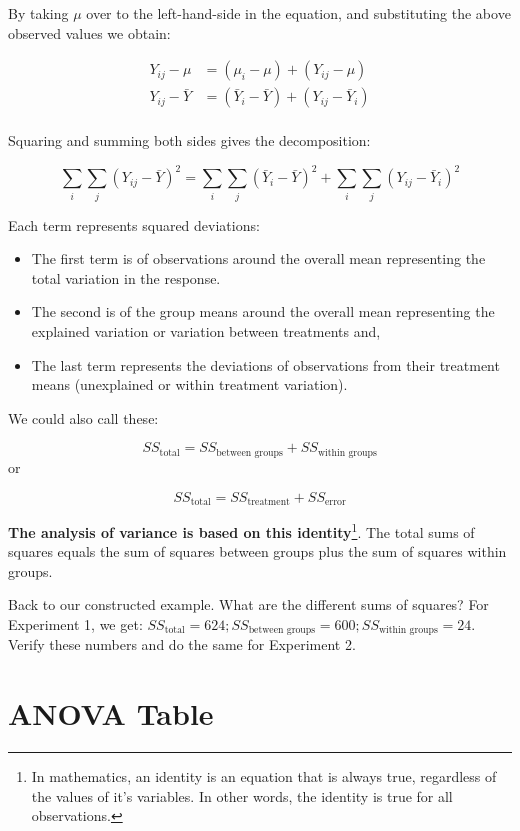 \documentclass[
  letterpaper,
]{book}
\providecommand{\tightlist}{%
  \setlength{\itemsep}{0pt}\setlength{\parskip}{0pt}}\usepackage{longtable,booktabs,array}
\begin{document}
By taking \(\mu\) over to the left-hand-side in the equation, and
substituting the above observed values we obtain:

\[
\begin{aligned}
Y_{ij} - \mu &= (\mu_i - \mu) + (Y_{ij} - \mu)\\
Y_{ij} - \bar{Y} &= (\bar{Y}_i - \bar{Y}) + (Y_{ij} - \bar{Y}_i) \\
\end{aligned}
\]

Squaring and summing both sides gives the decomposition:

\[
\sum_i \sum_j (Y_{ij} - \bar{Y})^2 = \sum_i \sum_j (\bar{Y}_i - \bar{Y})^2 + \sum_i \sum_j (Y_{ij} - \bar{Y}_i)^2
\]

Each term represents squared deviations:

\begin{itemize}
\tightlist
\item
  The first term is of observations around the overall mean representing
  the total variation in the response.
\item
  The second is of the group means around the overall mean representing
  the explained variation or variation between treatments and,
\item
  The last term represents the deviations of observations from their
  treatment means (unexplained or within treatment variation).
\end{itemize}

We could also call these:

\[
SS_{\text{total}} = SS_{\text{between groups}} + SS_{\text{within groups}}
\] or

\[
SS_{\text{total}} = SS_{\text{treatment}} + SS_{\text{error}}
\]

\textbf{The analysis of variance is based on this identity}\footnote{In
  mathematics, an identity is an equation that is always true,
  regardless of the values of it's variables. In other words, the
  identity is true for all observations.}. The total sums of squares
equals the sum of squares between groups plus the sum of squares within
groups.

Back to our constructed example. What are the different sums of squares?
For Experiment 1, we get:
\(SS_{\text{total}} = 624; SS_{\text{between groups}} = 600; SS_{\text{within groups}} = 24\).
Verify these numbers and do the same for Experiment 2.

\section{ANOVA Table}\label{anova-table}
\end{document}
